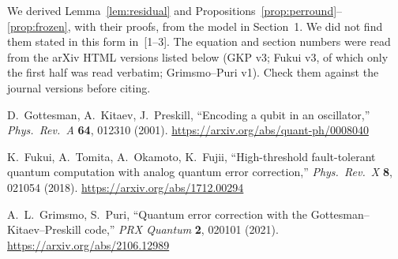 \documentclass[11pt,letterpaper]{article}
\begin{document}
\medskip
We derived Lemma~\ref{lem:residual} and
Propositions~\ref{prop:perround}--\ref{prop:frozen}, with their proofs, from
the model in Section~1. We did not find them stated in this form in~[1--3].
The equation and section numbers were read from the arXiv HTML versions
listed below (GKP v3; Fukui v3, of which only the first half was read
verbatim; Grimsmo--Puri v1). Check them against the journal versions before
citing.

\begin{enumerate}[label={[\arabic*]}]
  \item D.~Gottesman, A.~Kitaev, J.~Preskill, ``Encoding a qubit in an
    oscillator,'' \emph{Phys.\ Rev.\ A} \textbf{64}, 012310 (2001).
    \url{https://arxiv.org/abs/quant-ph/0008040}
  \item K.~Fukui, A.~Tomita, A.~Okamoto, K.~Fujii, ``High-threshold
    fault-tolerant quantum computation with analog quantum error correction,''
    \emph{Phys.\ Rev.\ X} \textbf{8}, 021054 (2018).
    \url{https://arxiv.org/abs/1712.00294}
  \item A.~L.~Grimsmo, S.~Puri, ``Quantum error correction with the
    Gottesman--Kitaev--Preskill code,'' \emph{PRX Quantum} \textbf{2}, 020101
    (2021). \url{https://arxiv.org/abs/2106.12989}
\end{enumerate}
\end{document}
